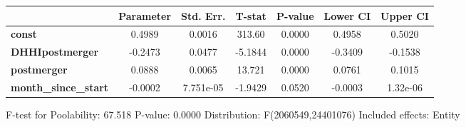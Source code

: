 \documentclass{report}
\begin{document}
\begin{center}
\begin{tabular}{lcccccc}
                             & \textbf{Parameter} & \textbf{Std. Err.} & \textbf{T-stat} & \textbf{P-value} & \textbf{Lower CI} & \textbf{Upper CI}  \\
\midrule
\textbf{const}               &       0.4989       &       0.0016       &      313.60     &      0.0000      &       0.4958      &       0.5020       \\
\textbf{DHHIpostmerger}      &      -0.2473       &       0.0477       &     -5.1844     &      0.0000      &      -0.3409      &      -0.1538       \\
\textbf{postmerger}          &       0.0888       &       0.0065       &      13.721     &      0.0000      &       0.0761      &       0.1015       \\
\textbf{month\_since\_start} &      -0.0002       &     7.751e-05      &     -1.9429     &      0.0520      &      -0.0003      &      1.32e-06      \\
\bottomrule
\end{tabular}
\end{center}

F-test for Poolability: 67.518 \newline
 P-value: 0.0000 \newline
 Distribution: F(2060549,24401076) \newline
  \newline
 Included effects: Entity
\end{document}
